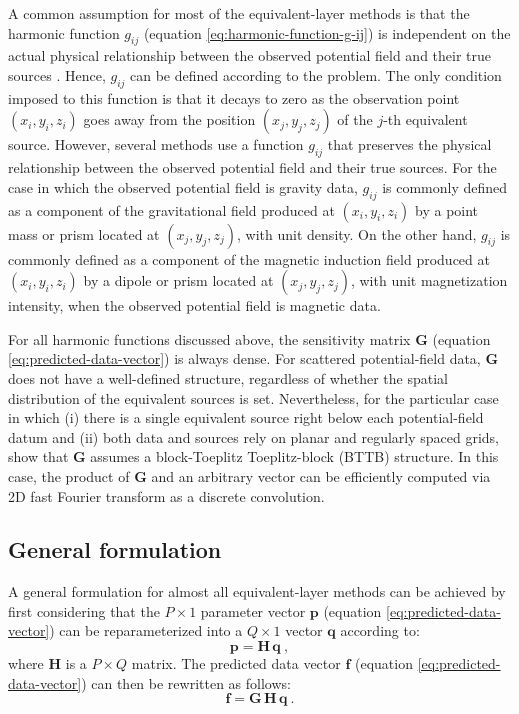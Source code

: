 A common assumption for most of the equivalent-layer methods is that the harmonic function $g_{ij}$ 
(equation \ref{eq:harmonic-function-g-ij}) is independent on the actual physical relationship between the
observed potential field and their true sources \cite[e.g.,][]{cordell1992, guspi-novara2009,li_etal_2014}.
Hence, $g_{ij}$ can be defined according to the problem.
The only condition imposed to this function is that it decays to zero as the observation point $(x_{i}, y_{i}, z_{i})$
goes away from the position $(x_{j}, y_{j}, z_{j})$ of the $j$-th equivalent source.
However, several methods use a function $g_{ij}$ that preserves the physical relationship between the
observed potential field and their true sources.
For the case in which the observed potential field is gravity data, $g_{ij}$ is commonly defined as a component of 
the gravitational field produced at $(x_{i}, y_{i}, z_{i})$ by a point mass or prism located at $(x_{j}, y_{j}, z_{j})$, with unit density.
On the other hand, $g_{ij}$ is commonly defined as a component of the 
magnetic induction field produced at $(x_{i}, y_{i}, z_{i})$ by a dipole or prism located at $(x_{j}, y_{j}, z_{j})$,
with unit magnetization intensity, when the observed potential field is magnetic data.

For all harmonic functions discussed above, the sensitivity matrix $\mathbf{G}$ (equation \ref{eq:predicted-data-vector}) 
is always dense. For scattered potential-field data, $\mathbf{G}$ does not have a well-defined structure, regardless of
whether the spatial distribution of the equivalent sources is set.
Nevertheless, for the particular case in which (i) there is a single equivalent source right below each potential-field
datum and (ii) both data and sources rely on planar and regularly spaced grids, \citet{takahashi-etal2020,takahashi-etal2022}
show that $\mathbf{G}$ assumes a block-Toeplitz Toeplitz-block (BTTB) structure. In this case, the product of $\mathbf{G}$ and an 
arbitrary vector can be efficiently computed via 2D fast Fourier transform as a discrete convolution.

\subsection{General formulation}
\label{subsec:general-formulation}

A general formulation for almost all equivalent-layer methods can be achieved by first considering 
that the $P \times 1$ parameter vector $\mathbf{p}$ (equation \ref{eq:predicted-data-vector}) can be reparameterized 
into a $Q \times 1$ vector $\mathbf{q}$ according to:
\begin{equation}
	\mathbf{p} = \mathbf{H} \, \mathbf{q} \: ,
	\label{eq:reparameterization}
\end{equation}
where $\mathbf{H}$ is a $P \times Q$ matrix.
The predicted data vector $\mathbf{f}$ (equation \ref{eq:predicted-data-vector}) can then be
rewritten as follows:
\begin{equation}
	\mathbf{f} = \mathbf{G} \, \mathbf{H} \, \mathbf{q} \: .
	\label{eq:predicted-data-vetor-reparameterized}
\end{equation}

